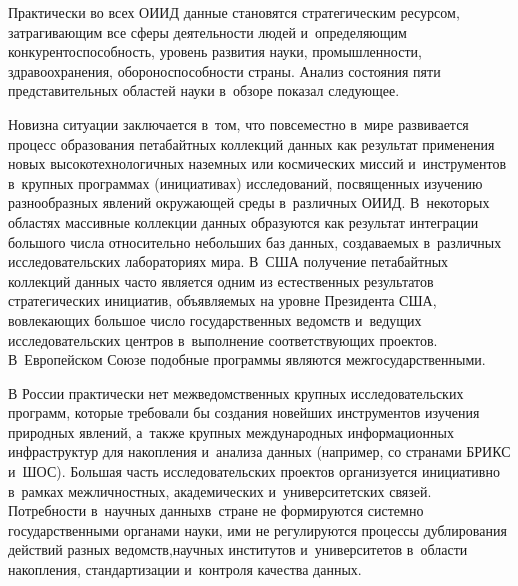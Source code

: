 \begin{multicols}{2}
  Практически во всех ОИИД данные становятся стратегическим ресурсом, 
затрагивающим все сферы деятельности людей и~определяющим конкурентоспособность, 
уровень развития науки, промышленности, здравоохранения, обороноспособности страны. 
Анализ состояния пяти представительных областей науки в~обзоре показал следующее.
  
  Новизна ситуации заключается в~том, что повсеместно в~мире развивается процесс 
образования петабайтных коллекций данных как результат применения новых 
высокотехнологичных наземных или космических миссий и~инструментов в~крупных 
программах (инициативах) исследований, посвященных изучению разнообразных явлений 
окружающей среды в~различных ОИИД. В~некоторых областях массивные коллекции 
данных образуются как результат интеграции большого числа относительно небольших 
баз данных, создаваемых в~различных исследовательских лабораториях мира. В~США 
получение петабайтных коллекций данных часто является одним из естественных 
результатов стратегических инициатив, объявляемых на уровне Президента США, 
вовлекающих большое число государственных ведомств и~ведущих исследовательских 
центров в~выполнение соответствующих проектов. В~Европейском Союзе подобные 
программы являются межгосударственными. 
  
  В России практически нет межведомственных крупных исследовательских программ, 
которые требовали бы создания новейших инструментов изучения природных явлений, 
а~также крупных международных информационных инфраструктур для накопления 
и~анализа данных (например, со странами БРИКС и~ШОС). Большая часть 
исследовательских проектов организуется инициативно в~рамках межличностных, 
академических и~университетских связей. Потребности в~научных данных\linebreak в~стране не 
формируются системно государственными органами науки, ими не регулируются 
процессы дублирования действий разных ведомств,\linebreak научных институтов и~университетов 
в~области накопления, стандартизации и~контроля качества данных.
  

\end{multicols}
